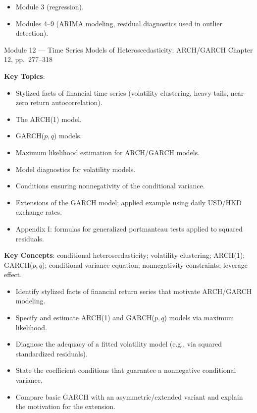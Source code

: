\documentclass[11pt]{article}
\newcommand{\keytopics}{\textbf{\color{modblue}Key Topics}}
\newcommand{\keyconcepts}{\textbf{\color{modblue}Key Concepts}}
\begin{document}
\begin{prereqs}
\begin{itemize}
  \item Module 3 (regression).
  \item Modules 4--9 (ARIMA modeling, residual diagnostics used in outlier detection).
\end{itemize}
\end{prereqs}

\vspace{6pt}
\begin{moduletitle}{Module 12 --- Time Series Models of Heteroscedasticity: ARCH/GARCH}
\small Chapter 12, pp.\ 277--318
\end{moduletitle}

\keytopics:
\begin{itemize}
  \item Stylized facts of financial time series (volatility clustering, heavy tails, near-zero return autocorrelation).
  \item The ARCH(1) model.
  \item GARCH($p,q$) models.
  \item Maximum likelihood estimation for ARCH/GARCH models.
  \item Model diagnostics for volatility models.
  \item Conditions ensuring nonnegativity of the conditional variance.
  \item Extensions of the GARCH model; applied example using daily USD/HKD exchange rates.
  \item Appendix I: formulas for generalized portmanteau tests applied to squared residuals.
\end{itemize}

\keyconcepts: conditional heteroscedasticity; volatility clustering; ARCH(1); GARCH($p,q$); conditional variance equation; nonnegativity constraints; leverage effect.

\begin{objectives}
\begin{itemize}
  \item Identify stylized facts of financial return series that motivate ARCH/GARCH modeling.
  \item Specify and estimate ARCH(1) and GARCH($p,q$) models via maximum likelihood.
  \item Diagnose the adequacy of a fitted volatility model (e.g., via squared standardized residuals).
  \item State the coefficient conditions that guarantee a nonnegative conditional variance.
  \item Compare basic GARCH with an asymmetric/extended variant and explain the motivation for the extension.
\end{itemize}
\end{objectives}
\end{document}
